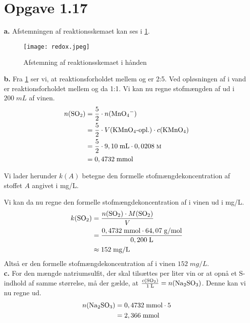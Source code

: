 \documentclass{report}
\begin{document}
\section*{Opgave 1.17}
\textbf{a.}
Afstemningen af reaktionsskemaet kan ses i \cref{fig:redox}.
\begin{figure}[H]
\begin{center}
  \texttt{[image: redox.jpeg]}
\end{center}
\caption{Afstemning af reaktionsskemaet i hånden}
\label{fig:redox}
\end{figure}
\noindent\textbf{b.}
Fra \cref{fig:redox} ser vi, at reaktionsforholdet mellem  og  er 2:5.
Ved opløsningen af  i vand er reaktionsforholdet mellem  og  da 1:1.
Vi kan nu regne stofmængden af  ud i $200 \;\unit{mL} $ af vinen. 
\begin{equation*}
\begin{split}
  n(\ce{SO2}) &=\frac{5}{2} \cdot n(\ce{MnO4-} )\\ 
  &=\frac{5}{2} \cdot V(\ce{KMnO4}\text{-opl.})\cdot c(\ce{KMnO4} )\\ 
  &=\frac{5}{2} \cdot 9,10 \;\unit{mL} \cdot 0,0208 \;\unit{\textsc{m}}\\ 
  &=0,4732 \;\unit{mmol} 
\end{split}
\end{equation*}
\begin{note}
  Vi lader herunder $k(A) $ betegne den formelle stofmængdekoncentration af stoffet $A$ angivet i \unit{mg/L}.
\end{note}
Vi kan da nu regne den formelle stofmængdekoncentration af  i vinen ud i \unit{mg/L}.
\begin{equation*}
\begin{split}
  k(\ce{SO2} )&=\frac{n(\ce{SO2} )\cdot M(\ce{SO2} )}{V}\\ 
  &=\frac{0,4732 \;\unit{mmol} \cdot 64,07 \;\unit{g/mol} }{0,200 \;\unit{L} }\\ 
  &\approx 152 \;\unit{mg/L} 
\end{split}
\end{equation*}
Altså er den formelle stofmængdekoncentration af  i vinen $152 \;\unit{mg/L} $. \\[1ex]
\textbf{c.}
For den mængde natriumsulfit, der skal tilsættes per liter vin or at opnå et S-indhold af samme størrelse, må der gælde, at $\frac{c(\ce{SO2} )}{1 \;\unit{L} }=n(\ce{Na2SO3} )$.
Denne kan vi nu regne ud.
\begin{equation*}
\begin{split}
  n(\ce{Na2SO3} )&=0,4732 \;\unit{mmol} \cdot 5\\ 
  &=2,366 \;\unit{mmol} 
\end{split}
\end{equation*}
\end{document}

